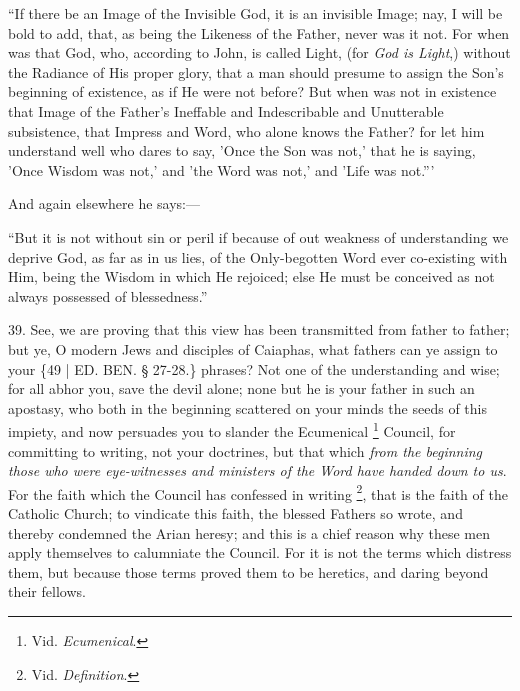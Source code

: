 
``If there be an Image of the
Invisible God, it is an invisible Image; nay, I will be bold to add,
that, as being the Likeness of the Father, never was it not. For when
was that God, who, according to John, is called Light, (for \emph{God is
Light},) without the Radiance of His proper glory, that a man
should presume to assign the Son's beginning of existence, as if He
were not before? But when was not in existence that Image of the
Father's Ineffable and Indescribable and Unutterable subsistence, that
Impress and Word, who alone knows the Father? for let him understand
well who dares to say, 'Once the Son was not,' that he is saying,
'Once Wisdom was not,' and 'the Word was not,' and 'Life was not.'''

And again elsewhere he
says:—


``But it is not without sin or
peril if because of out weakness of understanding we deprive God, as
far as in us lies, of the Only-begotten Word ever co-existing with
Him, being the Wisdom in which He rejoiced; else He must be conceived
as not always possessed of blessedness.''

39. See, we are proving that
this view has been transmitted from father to father; but ye, O modern
Jews and disciples of Caiaphas, what fathers can ye assign to your \{49
| ED.
BEN.
§ 27-28.\} phrases? Not one of the understanding and wise; for all
abhor you, save the devil alone; none but he is your father in such an
apostasy, who both in the beginning scattered on your minds the seeds
of this impiety, and now persuades you to slander the Ecumenical \footnote{Vid. \emph{Ecumenical}.} Council, for committing to writing, not your doctrines, but
that which \emph{from the beginning those who were eye-witnesses and
ministers of the Word have handed down to us}. For the faith which
the Council has confessed in writing \footnote{Vid. \emph{Definition}.}, that is the faith of the Catholic Church; to vindicate this
faith, the blessed Fathers so wrote, and thereby condemned the Arian
heresy; and this is a chief reason why these men apply themselves to
calumniate the Council. For it is not the terms which distress them,
but because those terms proved them to be heretics, and daring beyond
their fellows.


